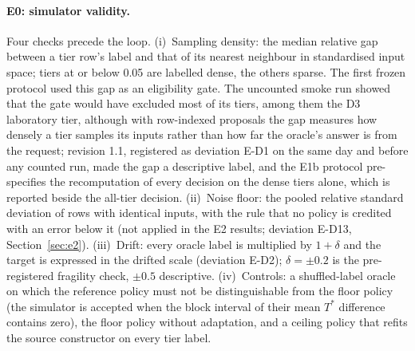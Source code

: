 \documentclass[11pt,a4paper]{article}
\begin{document}
\paragraph{E0: simulator validity.} Four checks precede the loop. (i)~Sampling density: the median
relative gap between a tier row's label and that of its nearest neighbour in standardised input
space; tiers at or below 0.05 are labelled dense, the others sparse. The first frozen
protocol used this gap as an eligibility gate. The uncounted smoke run showed that the gate would
have excluded most of its tiers, among them the D3 laboratory tier, although with row-indexed
proposals the gap measures how densely a tier samples its inputs rather than how far the oracle's
answer is from the request; revision 1.1, registered as deviation E-D1 on the same day and before any
counted run, made the gap a descriptive label, and the E1b protocol pre-specifies the recomputation
of every decision on the dense tiers alone, which is reported beside the all-tier decision.
(ii)~Noise floor: the pooled relative standard deviation of rows with identical inputs, with the rule
that no policy is credited with an error below it (not applied in the E2 results; deviation E-D13,
Section~\ref{sec:e2}). (iii)~Drift: every oracle label is multiplied by $1 + \delta$
and the target is expressed in the drifted scale (deviation E-D2); $\delta = \pm 0.2$ is the
pre-registered fragility check, $\pm 0.5$ descriptive. (iv)~Controls: a shuffled-label oracle on
which the reference policy must not be distinguishable from the floor policy (the simulator is
accepted when the block interval of their mean $T^{*}$ difference contains zero), the floor policy
without adaptation, and a ceiling policy that refits the source constructor on every tier label.
\end{document}
